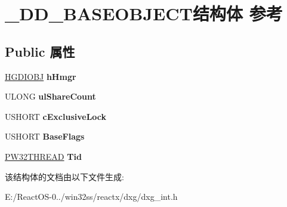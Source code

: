 \hypertarget{struct___d_d___b_a_s_e_o_b_j_e_c_t}{}\section{\+\_\+\+D\+D\+\_\+\+B\+A\+S\+E\+O\+B\+J\+E\+C\+T结构体 参考}
\label{struct___d_d___b_a_s_e_o_b_j_e_c_t}
\subsection*{Public 属性}
\begin{DoxyCompactItemize}
\item 
\mbox{\label{struct___d_d___b_a_s_e_o_b_j_e_c_t_ad0e6ec94999d7d0f611904cf640f843f}} 
\hyperlink{interfacevoid}{H\+G\+D\+I\+O\+BJ} {\bfseries h\+Hmgr}
\item 
\mbox{\label{struct___d_d___b_a_s_e_o_b_j_e_c_t_ad3f748c8bed9521a87a015c89ed4e0c4}} 
U\+L\+O\+NG {\bfseries ul\+Share\+Count}
\item 
\mbox{\label{struct___d_d___b_a_s_e_o_b_j_e_c_t_a938c149ac073bc02f572e9f850f7f964}} 
U\+S\+H\+O\+RT {\bfseries c\+Exclusive\+Lock}
\item 
\mbox{\label{struct___d_d___b_a_s_e_o_b_j_e_c_t_ae1ee0e7f0adb22acbe50c897829d7034}} 
U\+S\+H\+O\+RT {\bfseries Base\+Flags}
\item 
\mbox{\label{struct___d_d___b_a_s_e_o_b_j_e_c_t_aac576aaa0f78f3e4c8d5733bc0f1dc8f}} 
\hyperlink{interfacevoid}{P\+W32\+T\+H\+R\+E\+AD} {\bfseries Tid}
\end{DoxyCompactItemize}


该结构体的文档由以下文件生成\+:\begin{DoxyCompactItemize}
\item 
E\+:/\+React\+O\+S-\/0../win32ss/reactx/dxg/dxg\+\_\+int.\+h\end{DoxyCompactItemize}
